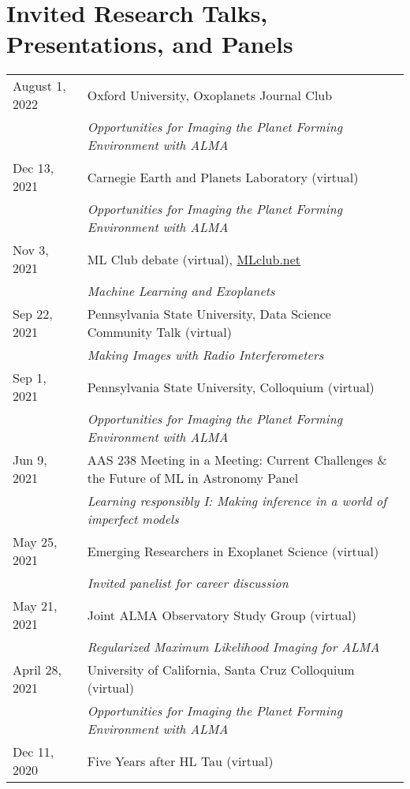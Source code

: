 \section*{Invited Research Talks, Presentations, and Panels}
\setlength\LTleft{0pt}
\setlength\LTright{0pt}
\begin{longtable}{@{\hspace{10pt}}p{1.2in}l}
  August 1, 2022 & Oxford University, Oxoplanets Journal Club\\
  & \emph{Opportunities for Imaging the Planet Forming Environment with ALMA}\\[\rowskip] 
  Dec 13, 2021 & Carnegie Earth and Planets Laboratory (virtual) \\
  & \emph{Opportunities for Imaging the Planet Forming Environment with ALMA} \\[\rowskip]
  Nov 3, 2021 & ML Club debate (virtual), \href{https://docs.google.com/document/d/1GGtE-YIuAWlmpKSr38_kyiF-Fklszhkh4FkiYWzBAho/pub}{MLclub.net} \\
  & \emph{Machine Learning and Exoplanets}\\[\rowskip]
  Sep 22, 2021 & Pennsylvania State University, Data Science Community Talk (virtual)\\
  & \emph{Making Images with Radio Interferometers} \\[\rowskip]
  Sep 1, 2021 & Pennsylvania State University, Colloquium (virtual)\\
  & \emph{Opportunities for Imaging the Planet Forming Environment with ALMA} \\[\rowskip]
  Jun 9, 2021 & AAS 238 Meeting in a Meeting: Current Challenges \& the Future of ML in Astronomy Panel\\
  & \emph{Learning responsibly I: Making inference in a world of imperfect models} \\[\rowskip]
  May 25, 2021 & Emerging Researchers in Exoplanet Science (virtual)\\
  & \emph{Invited panelist for career discussion} \\[\rowskip]
  May 21, 2021 & Joint ALMA Observatory Study Group (virtual)\\
  & \emph{Regularized Maximum Likelihood Imaging for ALMA}\\[\rowskip]
  April 28, 2021 & University of California, Santa Cruz Colloquium (virtual)\\
  & \emph{Opportunities for Imaging the Planet Forming Environment with ALMA} \\[\rowskip]
  Dec 11, 2020 & Five Years after HL Tau (virtual) \\ 

\end{longtable}
